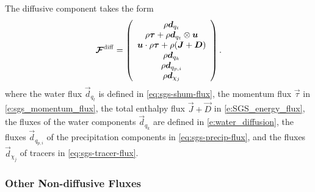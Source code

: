 \documentclass{report}
\begin{document}
{ The diffusive component takes the form 
 \begin{equation}
 \boldsymbol{{\mathcal{F}}}^{\mathrm{diff}}=\left( \begin{array}{c}
 \rho\boldsymbol{{d}}_{q_t} \\
 \rho\boldsymbol{{\tau}} + \rho\boldsymbol{{d}}_{q_t} \otimes \boldsymbol{{u}}\\
 \boldsymbol{{u}} \cdot \rho\boldsymbol{{\tau}} + \rho (\boldsymbol{{J}} + \boldsymbol{{D}}) \\
\rho\boldsymbol{{d}}_{q_k}\\
\rho \boldsymbol{{d}}_{q_{p, i}}\\
\rho \boldsymbol{{d}}_{\chi_j}
\end{array}
\right).
\label{eq:diff_flux}
\end{equation}
where the water flux $\vec{d}_{q_t}$ is defined in \eqref{eq:sgs-shum-flux}, the momentum flux $\vec{\tau}$ in \eqref{e:sgs_momentum_flux}, the total enthalpy flux $\vec{J} + \vec{D}$ in \eqref{e:SGS_energy_flux}, the fluxes of the water components $\vec{d}_{q_k}$ are defined in \eqref{e:water_diffusion}, the fluxes $\vec{d}_{q_{p, i}}$ of the precipitation components in \eqref{eq:sgs-precip-flux}, and the fluxes $\vec{d}_{\chi_j}$ of tracers in \eqref{eq:sgs-tracer-flux}.


\subsubsection{Other Non-diffusive Fluxes}

}
\end{document}
